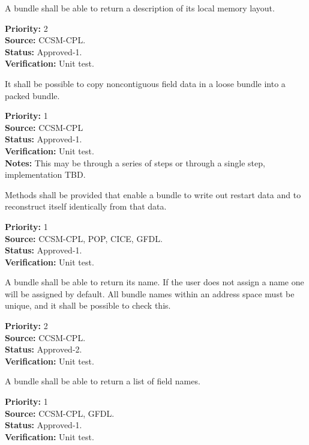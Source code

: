 A bundle shall be able to return a description of its local memory 
layout.
\begin{reqlist}
{\bf Priority:} 2 \\
{\bf Source:} CCSM-CPL. \\
{\bf Status:} Approved-1. \\
{\bf Verification:} Unit test. 
\end{reqlist}

It shall be possible to copy noncontiguous field data in a loose bundle
into a packed bundle.
\begin{reqlist}
{\bf Priority:} 1 \\
{\bf Source:} CCSM-CPL \\
{\bf Status:} Approved-1. \\
{\bf Verification:} Unit test. \\
{\bf Notes:} This may be through a series of steps or through a single step,
implementation TBD. 
\end{reqlist}

Methods shall be provided that enable a bundle to write out restart data and
to reconstruct itself identically from that data.
\begin{reqlist}
{\bf Priority:} 1\\
{\bf Source:} CCSM-CPL, POP, CICE, GFDL. \\
{\bf Status:} Approved-1. \\
{\bf Verification:} Unit test. 
\end{reqlist}


A bundle shall be able to return its name.  If the user does not
assign a name one will be assigned by default.  All bundle names
within an address space must be unique, and it shall be possible to
check this.
\begin{reqlist}
{\bf Priority:} 2 \\
{\bf Source:} CCSM-CPL. \\
{\bf Status:} Approved-2. \\
{\bf Verification:} Unit test.
\end{reqlist}

A bundle shall be able to return a list of field names.
\begin{reqlist}
{\bf Priority:} 1\\
{\bf Source:} CCSM-CPL, GFDL. \\
{\bf Status:} Approved-1. \\
{\bf Verification:} Unit test. 
\end{reqlist}

